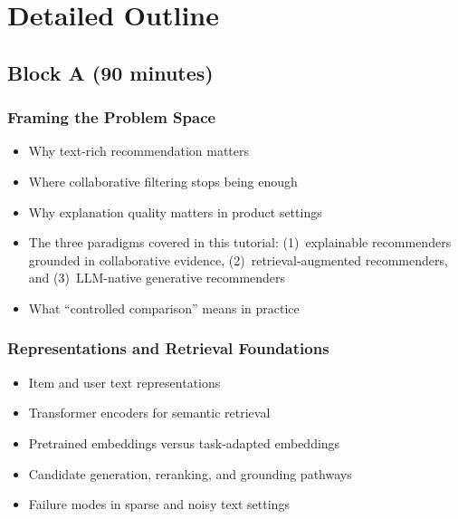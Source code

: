 \documentclass[sigconf,nonacm]{acmart}
\begin{document}
\section{Detailed Outline}

\subsection{Block A (90 minutes)}

\subsubsection{Framing the Problem Space}
\begin{itemize}
    \item Why text-rich recommendation matters
    \item Where collaborative filtering stops being enough
    \item Why explanation quality matters in product settings
    \item The three paradigms covered in this tutorial: (1)~explainable recommenders grounded in collaborative evidence, (2)~retrieval-augmented recommenders, and (3)~LLM-native generative recommenders
    \item What ``controlled comparison'' means in practice
\end{itemize}

\subsubsection{Representations and Retrieval Foundations}
\begin{itemize}
    \item Item and user text representations
    \item Transformer encoders for semantic retrieval
    \item Pretrained embeddings versus task-adapted embeddings
    \item Candidate generation, reranking, and grounding pathways
    \item Failure modes in sparse and noisy text settings
\end{itemize}
\end{document}
